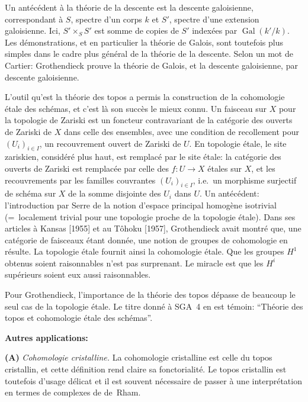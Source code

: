 \documentclass[11pt,a4paper]{article}
\theoremstyle{plain}
\theoremstyle{definition}
\DeclareMathOperator{\Gal}{Gal}
\begin{document}
Un ant\'ec\'edent \`a la th\'eorie de la descente est la descente galoisienne, correspondant \`a $S$, spectre d'un corps $k$ et $S'$, spectre d'une extension galoisienne. Ici, $S' \times_S S'$ est somme de copies de $S'$ index\'ees par $\Gal(k'/k)$. Les d\'emonstrations, et en particulier la th\'eorie de Galois, sont toutefois plus simples dans le cadre plus g\'en\'eral de la th\'eorie de la descente. Selon un mot de Cartier: Grothendieck prouve la th\'eorie de Galois, et la descente galoisienne, par descente galoisienne.

L'outil qu'est la th\'eorie des topos a permis la construction de la cohomologie \'etale des sch\'emas, et c'est l\`a son succ\`es le mieux connu. Un faisceau sur $X$ pour la topologie de Zariski est un foncteur contravariant de la cat\'egorie des ouverts de Zariski de $X$ dans celle des ensembles, avec une condition de recollement pour $(U_i)_{i \in I}$, un recouvrement ouvert de Zariski de $U$. En topologie \'etale, le site zariskien, consid\'er\'e plus haut, est remplac\'e par le site \'etale: la cat\'egorie des ouverts de Zariski est remplac\'ee par celle des $f \colon U \to X$ \'etales sur $X$, et les recouvrements par les familles couvrantes $(U_i)_{i \in I}$, i.e.\ un morphisme surjectif de sch\'ema sur $X$ de la somme disjointe des $U_i$ dans $U$. Un ant\'ec\'edent: l'introduction par Serre de la notion d'espace principal homog\`ene isotrivial (=~localement trivial pour une topologie proche de la topologie \'etale). Dans ses articles \`a Kansas [1955] et au T\^ohoku [1957], Grothendieck avait montr\'e que, une cat\'egorie de faisceaux \'etant donn\'ee, une notion de groupes de cohomologie en r\'esulte. La topologie \'etale fournit ainsi la cohomologie \'etale. Que les groupes $H^1$ obtenus soient raisonnables n'est pas surprenant. Le miracle est que les $H^i$ sup\'erieurs soient eux aussi raisonnables.

Pour Grothendieck, l'importance de la th\'eorie des topos d\'epasse de beaucoup le seul cas de la topologie \'etale. Le titre donn\'e \`a SGA~4 en est t\'emoin: ``Th\'eorie des topos et cohomologie \'etale des sch\'emas''.

\textbf{Autres applications:}

\medskip
\textbf{(A)} \emph{Cohomologie cristalline.} La cohomologie cristalline est celle du topos cristallin, et cette d\'efinition rend claire sa fonctorialit\'e. Le topos cristallin est toutefois d'usage d\'elicat et il est souvent n\'ecessaire de passer \`a une interpr\'etation en termes de complexes de de~Rham.
\end{document}
